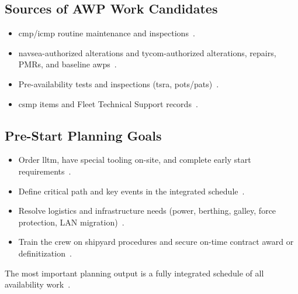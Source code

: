 \documentclass[../main.tex]{subfiles}
\begin{document}
\subsection{Sources of AWP Work Candidates}
\begin{itemize}
  \item \ac{cmp}/\ac{icmp} routine maintenance and inspections~\autocite{COMFLTFORCOMINST4790-3,edo-4-2-1-cno-availability-planning-2025}.
  \item \ac{navsea}-authorized alterations and \ac{tycom}-authorized alterations, repairs, PMRs, and baseline \acp{awp}~\autocite{COMFLTFORCOMINST4790-3,edo-4-2-1-cno-availability-planning-2025}.
  \item Pre-availability tests and inspections (\ac{tsra}, \ac{pots}/\ac{pats})~\autocite{COMFLTFORCOMINST4790-3,edo-4-2-1-cno-availability-planning-2025}.
  \item \ac{csmp} items and Fleet Technical Support records~\autocite{COMFLTFORCOMINST4790-3,edo-4-2-1-cno-availability-planning-2025}.
\end{itemize}

\subsection{Pre-Start Planning Goals}
\begin{itemize}
  \item Order \ac{lltm}, have special tooling on-site, and complete early start requirements~\autocite{edo-4-2-1-cno-availability-planning-2025}.
  \item Define critical path and key events in the integrated schedule~\autocite{edo-4-2-1-cno-availability-planning-2025}.
  \item Resolve logistics and infrastructure needs (power, berthing, galley, force protection, LAN migration)~\autocite{edo-4-2-1-cno-availability-planning-2025}.
  \item Train the crew on shipyard procedures and secure on-time contract award or definitization~\autocite{edo-4-2-1-cno-availability-planning-2025}.
\end{itemize}
The most important planning output is a fully integrated schedule of all availability work~\autocite{edo-4-2-1-cno-availability-planning-2025}.
\end{document}
